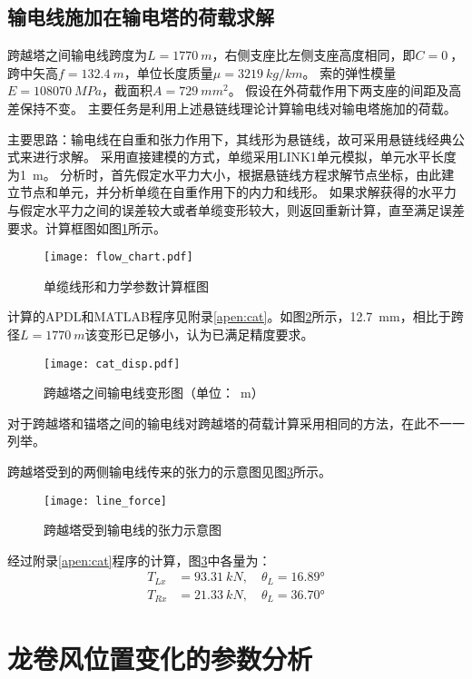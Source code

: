 \subsection{输电线施加在输电塔的荷载求解}

跨越塔之间输电线跨度为$L=\SI{1770}{m}$，右侧支座比左侧支座高度相同，即$C=\SI{0}{}$，跨中矢高$f=\SI{132.4}{m}$，单位长度质量$\mu=\SI{3219}{kg/km}$。
索的弹性模量$E=\SI{108070}{MPa}$，截面积$A=\SI{729}{mm^2}$。
假设在外荷载作用下两支座的间距及高差保持不变。
主要任务是利用上述悬链线理论计算输电线对输电塔施加的荷载。

主要思路：输电线在自重和张力作用下，其线形为悬链线，故可采用悬链线经典公式来进行求解。
采用直接建模的方式，单缆采用LINK1单元模拟，单元水平长度为\SI{1}{m}。
分析时，首先假定水平力大小，根据悬链线方程求解节点坐标，由此建立节点和单元，并分析单缆在自重作用下的内力和线形。
如果求解获得的水平力与假定水平力之间的误差较大或者单缆变形较大，则返回重新计算，直至满足误差要求。计算框图如图\ref{fig:flow-chart}所示。
\begin{figure}[!htpb]
\centering
\texttt{[image: flow\_chart.pdf]}
\caption{单缆线形和力学参数计算框图}
\label{fig:flow-chart}
\end{figure}

计算的APDL和MATLAB程序见附录\ref{apen:cat}。如图\ref{fig:cat-disp}所示，\SI{12.7}{mm}，相比于跨径$L=\SI{1770}{m}$该变形已足够小，认为已满足精度要求。

\begin{figure}[!htbp]
\centering
\texttt{[image: cat\_disp.pdf]}
\caption{跨越塔之间输电线变形图（单位：\SI{}{m}）}
\label{fig:cat-disp}
\end{figure}

对于跨越塔和锚塔之间的输电线对跨越塔的荷载计算采用相同的方法，在此不一一列举。

跨越塔受到的两侧输电线传来的张力的示意图见图\ref{fig:line-force}所示。

\begin{figure}[!htbp]
\centering
\texttt{[image: line\_force]}
\caption{跨越塔受到输电线的张力示意图}
\label{fig:line-force}
\end{figure}

经过附录\ref{apen:cat}程序的计算，图\ref{fig:line-force}中各量为：
\begin{equation}
\begin{split}
  T_{Lx} & = \SI{93.31}{kN},\quad \theta_L  = \ang{16.89} \\
  T_{Rx} & = \SI{21.33}{kN},\quad \theta_L  = \ang{36.70}
\end{split}
\end{equation}





\section{龙卷风位置变化的参数分析}
